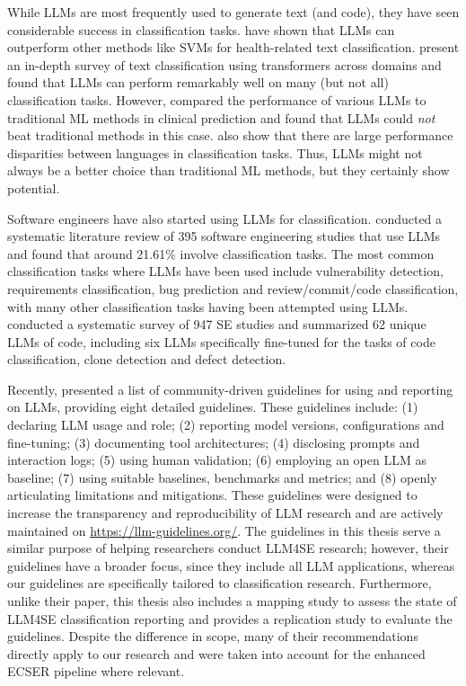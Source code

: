 \documentclass[a4paper]{article}
\begin{document}
While LLMs are most frequently used to generate text (and code), they have seen considerable success in classification tasks. \textcite{Guo2024health} have shown that LLMs can outperform other methods like SVMs for health-related text classification. \textcite{fields2024} present an in-depth survey of text classification using transformers across domains and found that LLMs can perform remarkably well on many (but not all) classification tasks. However, \textcite{Chen2024} compared the performance of various LLMs to traditional ML methods in clinical prediction and found that LLMs could \textit{not} beat traditional methods in this case. \textcite{vajjala2025} also show that there are large performance disparities between languages in classification tasks. Thus, LLMs might not always be a better choice than traditional ML methods, but they certainly show potential. 

Software engineers have also started using LLMs for classification. \textcite{hou2024} conducted a systematic literature review of 395 software engineering studies that use LLMs and found that around 21.61\% involve classification tasks. The most common classification tasks where LLMs have been used include vulnerability detection, requirements classification, bug prediction and review/commit/code classification, with many other classification tasks having been attempted using LLMs. \textcite{zhang2024} conducted a systematic survey of 947 SE studies and summarized 62 unique LLMs of code, including six LLMs specifically fine-tuned for the tasks of code classification, clone detection and defect detection.

Recently, \textcite{baltes2025guidelinesempiricalstudiessoftware} presented a list of community-driven guidelines for using and reporting on LLMs, providing eight detailed guidelines. These guidelines include: (1) declaring LLM usage and role; (2) reporting model versions, configurations and fine-tuning; (3) documenting tool architectures; (4) disclosing prompts and interaction logs; (5) using human validation; (6) employing an open LLM as baseline; (7) using suitable baselines, benchmarks and metrics; and (8) openly articulating limitations and mitigations. These guidelines were designed to increase the transparency and reproducibility of LLM research and are actively maintained on \url{https://llm-guidelines.org/}. The guidelines in this thesis serve a similar purpose of helping researchers conduct LLM4SE research; however, their guidelines have a broader focus, since they include all LLM applications, whereas our guidelines are specifically tailored to classification research. Furthermore, unlike their paper, this thesis also includes a mapping study to assess the state of LLM4SE classification reporting and provides a replication study to evaluate the guidelines. Despite the difference in scope, many of their recommendations directly apply to our research and were taken into account for the enhanced ECSER pipeline where relevant.
\end{document}
